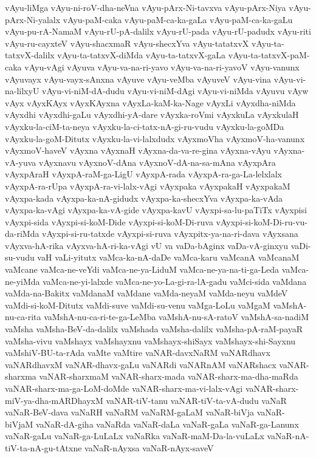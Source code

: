 {vAyu-liMga
vAyu-ni-roV-dha-neVna
vAyu-pArx-Ni-tavxva
vAyu-pArx-Niya
vAyu-pArx-Ni-yalalx
vAyu-paM-caka
vAyu-paM-ca-ka-gaLa
vAyu-paM-ca-ka-gaLu
vAyu-pu-rA-NamaM
vAyu-rU-pA-dalilx
vAyu-rU-pada
vAyu-rU-padudx
vAyu-riti
vAyu-ru-cayxteV
vAyu-shacxmaR
vAyu-shecxYva
vAyu-tatatxvX
vAyu-ta-tatxvX-dalilx
vAyu-ta-tatxvX-diMda
vAyu-ta-tatxvX-gaLa
vAyu-ta-tatxvX-paM-caka
vAyu-vAgi
vAyuva
vAyu-va-na-ri-yavo
vAyu-va-na-ri-yavoV
vAyu-vanunx
vAyuvayx
vAyu-vayx-sAnxna
vAyuve
vAyu-veMba
vAyuveV
vAyu-vina
vAyu-vi-na-lilxyU
vAyu-vi-niM-dA-dudu
vAyu-vi-niM-dAgi
vAyu-vi-niMda
vAyuvu
vAyw
vAyx
vAyxKAyx
vAyxKAyxna
vAyxLa-kaM-ka-Nage
vAyxLi
vAyxdha-niMda
vAyxdhi
vAyxdhi-gaLu
vAyxdhi-yA-dare
vAyxka-roVmi
vAyxkuLa
vAyxkulaH
vAyxku-la-ciM-ta-neya
vAyxku-la-ci-tatx-nA-gi-ru-vudu
vAyxku-la-goMDa
vAyxku-la-goM-Ditutx
vAyxku-la-vi-lalxdudx
vAyxmoVha
vAyxmoV-ha-vanunx
vAyxmoV-haveV
vAyxna
vAyxnaH
vAyxna-da-va-re-gina
vAyxna-vAyu
vAyxna-vA-yuva
vAyxnavu
vAyxnoV-dAna
vAyxnoV-dA-na-sa-mAna
vAyxpAra
vAyxpAraH
vAyxpA-raM-ga-LigU
vAyxpA-rada
vAyxpA-ra-ga-La-lelxlalx
vAyxpA-ra-rUpa
vAyxpA-ra-vi-lalx-vAgi
vAyxpaka
vAyxpakaH
vAyxpakaM
vAyxpa-kada
vAyxpa-ka-nA-gidudx
vAyxpa-ka-shecxYva
vAyxpa-ka-vAda
vAyxpa-ka-vAgi
vAyxpa-ka-vA-gide
vAyxpa-kavU
vAyxpi-sa-lu-paTiTx
vAyxpisi
vAyxpi-sida
vAyxpi-si-koM-Dide
vAyxpi-si-koM-Di-ruva
vAyxpi-si-koM-Di-ru-vu-da-riMda
vAyxpi-si-ru-tatxde
vAyxpi-si-ruva
vAyxpitx-ya-na-ri-dava
vAyxsana
vAyxva-hA-rika
vAyxva-hA-ri-ka-vAgi
vU
va
vaDa-bAginx
vaDa-vA-ginxyu
vaDi-su-vudu
vaH
vaLi-yitutx
vaMca-ka-nA-daDe
vaMca-karu
vaMcanA
vaMcanaM
vaMcane
vaMca-ne-veYdi
vaMca-ne-ya-LiduM
vaMca-ne-ya-na-ti-ga-Leda
vaMca-ne-yiMda
vaMca-ne-yi-lalxde
vaMca-ne-yo-La-gi-ra-lA-gadu
vaMci-sida
vaMdana
vaMda-na-Bakitx
vaMdanaM
vaMdane
vaMda-neyaM
vaMda-neyu
vaMdeV
vaMdi-si-koM-Ditutx
vaMdi-suve
vaMdi-su-venu
vaMga-LoLu
vaMgaM
vaMshA-nu-ca-rita
vaMshA-nu-ca-ri-te-ga-LeMba
vaMshA-nu-sA-ratoV
vaMshA-sa-nadiM
vaMsha
vaMsha-BeV-da-dalilx
vaMshada
vaMsha-dalilx
vaMsha-pA-raM-payaR
vaMsha-vivu
vaMshayx
vaMshayxnu
vaMshayx-shiSayx
vaMshayx-shi-Sayxnu
vaMshiV-BU-ta-rAda
vaMte
vaMtire
vaNAR-davxNaRM
vaNARdhavx
vaNARdhavxM
vaNAR-dhavx-gaLu
vaNARdi
vaNARnAM
vaNARshacx
vaNAR-sharxma
vaNAR-sharxmaM
vaNAR-sharx-mada
vaNAR-sharx-ma-dha-maRda
vaNAR-sharx-ma-ga-LoM-doMde
vaNAR-sharx-ma-vi-lalx-vAgi
vaNAR-sharx-miV-ya-dha-mARDhayxM
vaNAR-tiV-tanu
vaNAR-tiV-ta-vA-dudu
vaNaR
vaNaR-BeV-dava
vaNaRH
vaNaRM
vaNaRM-gaLaM
vaNaR-biVja
vaNaR-biVjaM
vaNaR-dA-giha
vaNaRda
vaNaR-daLa
vaNaR-gaLa
vaNaR-ga-Lanunx
vaNaR-gaLu
vaNaR-ga-LuLaLx
vaNaRka
vaNaR-maM-Da-la-vuLaLx
vaNaR-nA-tiV-ta-nA-gu-tAtxne
vaNaR-nAyxsa
vaNaR-nAyx-saveV
}
